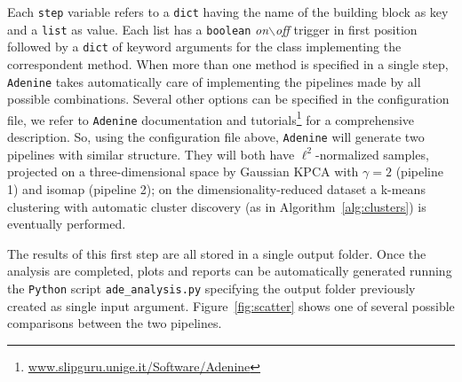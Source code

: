 \documentclass[twoside,11pt]{article}
\makeatletter
\newcommand{\ade}{\texttt{Adenine}\@\xspace}
\newcommand{\py}{\texttt{Python}\@\xspace}
\makeatother
\begin{document}
\noindent Each \texttt{step} variable refers to a \texttt{dict} having the name of the building block as key and a \texttt{list} as value. Each list has a \texttt{boolean} \emph{on$\backslash$off} trigger in first position followed by a \texttt{dict} of keyword arguments for the class implementing the correspondent method. When more than one method is specified in a single step, \ade takes automatically care of implementing the pipelines made by all possible combinations. Several other options can be specified in the configuration file, we refer to \ade documentation and tutorials\footnote{\href{www.slipguru.unige.it/Software/Adenine}{www.slipguru.unige.it/Software/Adenine}} for a comprehensive description. So, using the configuration file above, \ade will generate two pipelines with similar structure. They will both have $\ell^2$-normalized samples, projected on a three-dimensional space by Gaussian KPCA with $\gamma=2$ (pipeline 1) and isomap (pipeline 2); on the dimensionality-reduced dataset a k-means clustering with automatic cluster discovery (as in Algorithm~\ref{alg:clusters}) is eventually performed.

The results of this first step are all stored in a single output folder. Once the analysis are completed, plots and reports can be automatically generated running the \py script \texttt{ade\_analysis.py} specifying the output folder previously created as single input argument. Figure~\ref{fig:scatter} shows one of several possible comparisons between the two pipelines.
\end{document}
